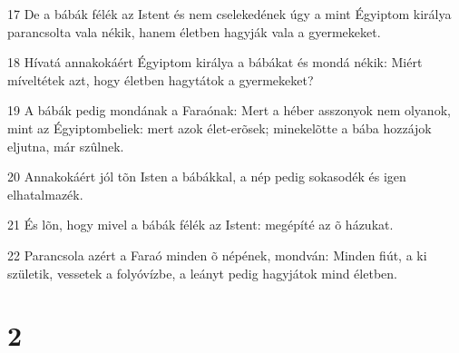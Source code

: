 \par 17 De a bábák félék az Istent és nem cselekedének úgy a mint Égyiptom királya parancsolta vala nékik, hanem életben hagyják vala a gyermekeket.
\par 18 Hívatá annakokáért Égyiptom királya a bábákat és mondá nékik: Miért míveltétek azt, hogy életben hagytátok a gyermekeket?
\par 19 A bábák pedig mondának a Faraónak: Mert a héber asszonyok nem olyanok, mint az Égyiptombeliek: mert azok élet-erõsek; minekelõtte a bába hozzájok eljutna, már szûlnek.
\par 20 Annakokáért jól tõn Isten a bábákkal, a nép pedig sokasodék és igen elhatalmazék.
\par 21 És lõn, hogy mivel a bábák félék az Istent: megépíté az õ házukat.
\par 22 Parancsola azért a Faraó minden õ népének, mondván: Minden fiút, a ki születik, vessetek a folyóvízbe, a leányt pedig hagyjátok mind életben.

\chapter{2}

